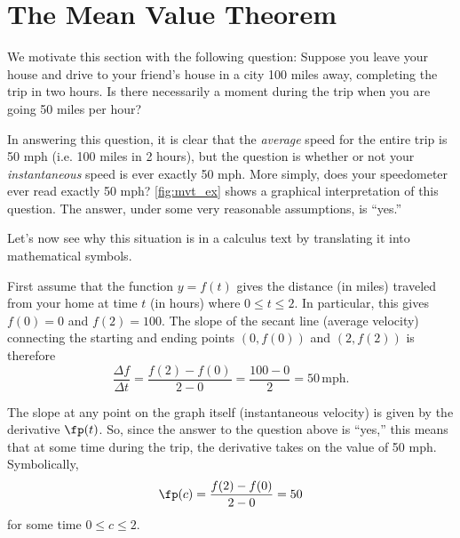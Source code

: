\section{The Mean Value Theorem}\label{sec:mvt}

We motivate this section with the following question: Suppose you leave your house and drive to your friend's house in a city 100 miles away, completing the trip in two hours.  Is there necessarily a moment during the trip when you are going 50 miles per hour?

In answering this question, it is clear that the \emph{average} speed for the entire trip is 50 mph (i.e. 100 miles in 2 hours), but the question is whether or not your \emph{instantaneous} speed is ever exactly 50 mph. More simply, does your speedometer ever read exactly 50 mph?  \autoref{fig:mvt_ex} shows a graphical interpretation of this question.  The answer, under some very reasonable assumptions, is ``yes.''


Let's now see why this situation is in a calculus text by translating it into mathematical symbols.\bigbreak

First assume that the function $y = f(t)$ gives the distance (in miles) traveled from your home at time $t$ (in hours) where $0\le t\le 2$.  In particular, this gives $f(0)=0$ and $f(2)=100$.  The slope of the secant line (average velocity) connecting the starting and ending points $(0,f(0))$ and $(2,f(2))$ is therefore 
\[
\frac{\Delta f}{\Delta t} = \frac{f(2)-f(0)}{2-0} = \frac{100-0}{2} = 50 \, \text{mph}.
\]

The slope at any point on the graph itself (instantaneous velocity) is given by the derivative $\fp(t)$.  So, since the answer to the question above is ``yes,'' this means that at some time during the trip, the derivative takes on the value of 50 mph.  Symbolically, 
\[\fp(c) = \frac{f(2)-f(0)}{2-0} = 50\]
for some time $0\le c \le 2.$\bigskip

